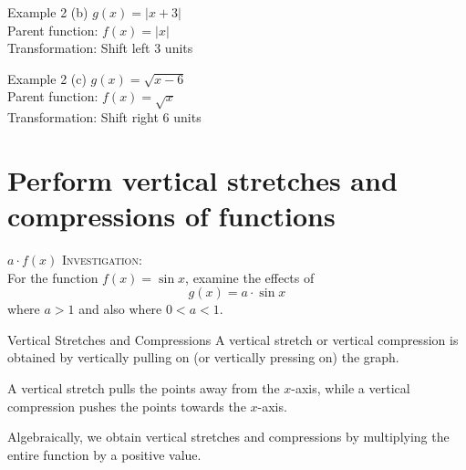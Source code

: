 \documentclass[t]{beamer}
\begin{document}
\begin{frame}{Example 2}
(b) \quad $g(x) = |x+3|$	\newline\\	\pause
Parent function: $f(x) = |x|$ \newline\\	\pause
Transformation: Shift left 3 units
\end{frame}

\begin{frame}{Example 2}
(c) \quad $g(x) = \sqrt{x-6}$	\newline\\	\pause
Parent function: $f(x) = \sqrt{x}$ \newline\\	\pause
Transformation: Shift right 6 units
\end{frame}

\section{Perform vertical stretches and compressions of functions}

\begin{frame}{$a \cdot f(x)$}
\textsc{Investigation:}	\newline\\

For the function $f(x) = \sin x$, examine the effects of
\[g(x) = a \cdot \sin x \]
where $a > 1$ and also where $0 < a < 1$.
\end{frame}

\begin{frame}{Vertical Stretches and Compressions}
A \alert{vertical stretch} or \alert{vertical compression} is obtained by vertically pulling on (or vertically pressing on) the graph.	\newline\\	\pause

A vertical stretch pulls the points away from the $x$-axis, while a vertical compression pushes the points towards the $x$-axis. \newline\\ \pause

Algebraically, we obtain vertical stretches and compressions by multiplying the entire function by a positive value.
\end{frame}
\end{document}
